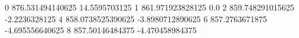 0 876.531494140625 14.5595703125
1 861.971923828125 0.0
2 859.748291015625 -2.2236328125
4 858.0738525390625 -3.8980712890625
6 857.2763671875 -4.695556640625
8 857.50146484375 -4.470458984375
